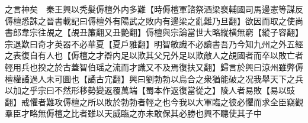 之言神矣　秦王興以秃髮傉檀外内多難【時傉檀軍諮祭酒梁裒輔國司馬邊憲等謀反傉檀悉誅之晉書載記曰傉檀外有陽武之敗内有邊梁之亂難乃旦翻】欲因而取之使尚書郎韋宗往覘之【覘丑簾翻又丑艷翻】傉檀與宗論當世大略縱横無窮【縱子容翻】宗退歎曰奇才英器不必華夏【夏戶雅翻】明智敏識不必讀書吾乃今知九州之外五經之表復自有人也【傉檀之才辯内足以欺其父兄外足以欺敵人之覘國者而卒以敗亡者輕用兵也揆之於古蓋智伯瑶之流而才識又不及焉復扶又翻】歸言於興曰涼州雖弊傉檀權譎過人未可圖也【譎古宂翻】興曰劉勃勃以烏合之衆猶能破之况我舉天下之兵以加之乎宗曰不然形移勢變返覆萬端【蜀本作返復當從之】陵人者易敗【易以豉翻】戒懼者難攻傉檀之所以敗於勃勃者輕之也今我以大軍臨之彼必懼而求全臣竊觀羣臣才略無傉檀之比者雖以天威臨之亦未敢保其必勝也興不聽使其子中